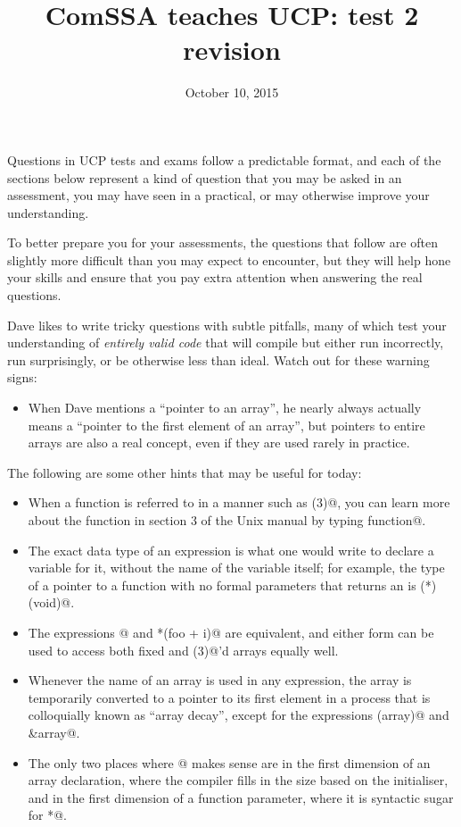 \documentclass[a4paper,12pt]{article}
\title{ComSSA teaches UCP: test 2 revision}
\date{October 10, 2015}
\begin{document}
\maketitle

Questions in UCP tests and exams follow a predictable format, and each
of the sections below represent a kind of question that you may be
asked in an assessment, you may have seen in a practical, or may
otherwise improve your understanding.

To better prepare you for your assessments, the questions that follow
are often slightly more difficult than you may expect to encounter, but
they will help hone your skills and ensure that you pay extra attention
when answering the real questions.

Dave likes to write tricky questions with subtle pitfalls, many of
which test your understanding of \emph{entirely valid code} that will
compile but either run incorrectly, run surprisingly, or be otherwise
less than ideal. Watch out for these warning signs:

\begin{itemize}
	\item When Dave mentions a ``pointer to an array'', he nearly
	      always actually means a ``pointer to the first element of
	      an array'', but pointers to entire arrays are also a
	      real concept, even if they are used rarely in practice.
\end{itemize}

The following are some other hints that may be useful for today:

\begin{itemize}
	\item When a function is referred to in a manner such as
	      \lstinline@function(3)@, you can learn more about the
	      function in section 3 of the Unix manual by typing
	       function@.
	\item The exact data type of an expression is what one would
	      write to declare a variable for it, without the name of
	      the variable itself; for example, the type of a pointer
	      to a function with no formal parameters that returns an
	      \lstinline@int@ is \lstinline@int (*)(void)@.
	\item The expressions \lstinline@foo[i]@ and
	      \lstinline@*(foo + i)@ are equivalent, and either form
	      can be used to access both fixed and
	      \lstinline@malloc(3)@'d arrays equally well.
	\item Whenever the name of an array is used in any expression,
	      the array is temporarily converted to a pointer to its
	      first element in a process that is colloquially known as
	      ``array decay'', except for the expressions
	      \lstinline@sizeof(array)@ and \lstinline@&array@.
	\item The only two places where \lstinline@[]@ makes sense are
	      in the first dimension of an array declaration, where the
	      compiler fills in the size based on the initialiser, and
	      in the first dimension of a function parameter, where it
	      is syntactic sugar for \lstinline@*@.
\end{itemize}
\end{document}
